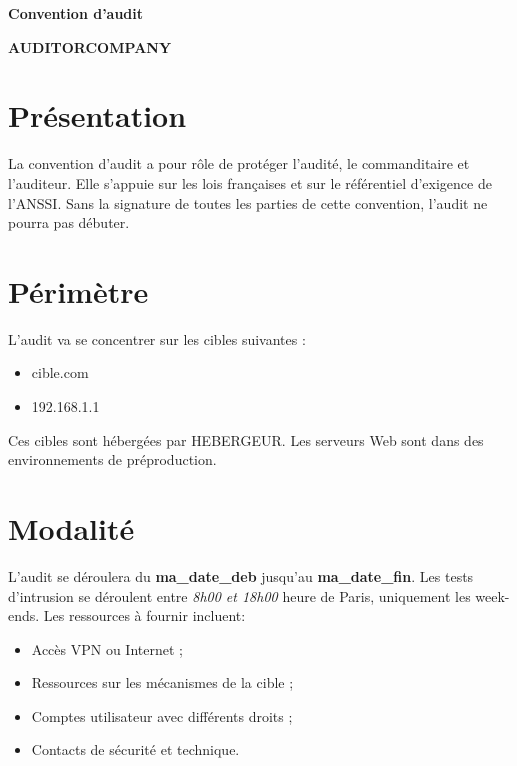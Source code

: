 \documentclass[12pt]{extarticle}
\begin{document}
\begin{titlepage}
    \centering
    \vspace*{3cm}
    \vspace{1cm}
    {\Huge\bfseries Convention d'audit \par}
    \vspace{2cm}
    {\Large \bfseries AUDITORCOMPANY \par}
    \vfill
    \vspace{2cm}
\end{titlepage}

\newpage
\section*{Présentation}
La convention d’audit a pour rôle de protéger l’audité, le commanditaire et l’auditeur. Elle s’appuie sur les lois françaises et sur le référentiel d’exigence de l’ANSSI. Sans la signature de toutes les parties de cette convention, l’audit ne pourra pas débuter.

\newpage
\section*{Périmètre}
L’audit va se concentrer sur les cibles suivantes :
\begin{itemize}
    \item cible.com
    \item 192.168.1.1
\end{itemize}

Ces cibles sont hébergées par {{HEBERGEUR}}. Les serveurs Web sont dans des environnements de préproduction.

\newpage
\section*{Modalité}
L’audit se déroulera du \textbf{ma\_date\_deb} jusqu’au \textbf{ma\_date\_fin}. Les tests d’intrusion se déroulent entre \textit{8h00 et 18h00} heure de Paris, uniquement les week-ends. Les ressources à fournir incluent:
\begin{itemize}
    \item Accès VPN ou Internet ;
    \item Ressources sur les mécanismes de la cible ;
    \item Comptes utilisateur avec différents droits ;
    \item Contacts de sécurité et technique.
\end{itemize}
\end{document}
